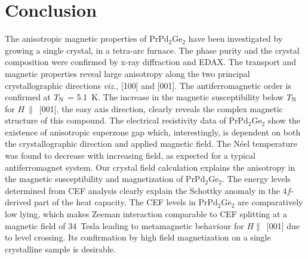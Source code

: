 \documentclass[preprint,showpacs,preprintnumbers,amsmath,amssymb, prb]{revtex4}
\begin{document}
\section{Conclusion}
%
The anisotropic magnetic properties of PrPd$_2$Ge$_2$ have been investigated by growing a single crystal, in a tetra-arc furnace.  The phase purity and the crystal composition were confirmed by x-ray diffraction and EDAX.  The transport and magnetic properties reveal large anisotropy along the two principal crystallographic directions \textit{viz.}, [100] and [001].  The antiferromagnetic order is confirmed at $T_{\rm N}$ = 5.1~K. The increase in the magnetic susceptibility below $T_{\rm N}$ for $H~\parallel$~[001], the easy axis direction, clearly reveals the complex magnetic structure of this compound. The electrical resistivity data of PrPd$_2$Ge$_2$ show the existence  of anisotropic superzone gap which, interestingly, is dependent on both the crystallographic direction and applied magnetic field.  The N\'{e}el temperature was found to decrease with increasing field, as expected for a typical antiferromagnet system.   Our crystal field calculation explains  the anisotropy in the magnetic susceptibility and magnetization of PrPd$_2$Ge$_2$.  The energy levels determined from CEF analysis clearly explain the Schottky anomaly in the $4f$\--derived part of the heat capacity. The CEF levels in PrPd$_2$Ge$_2$ are comparatively low lying, which makes Zeeman interaction comparable to CEF splitting at a magnetic field of 34~Tesla leading to metamagnetic behaviour for $H\parallel$~[001]  due to level crossing. Its confirmation by high field magnetization on a single crystalline sample is desirable.
%
\end{document}

